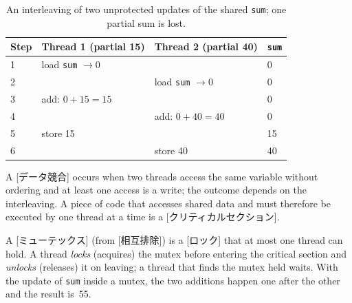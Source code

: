 \documentclass[../main.tex]{subfiles}
\begin{document}
\begin{table}[tb]
  \centering
  \small
  \caption{An interleaving of two unprotected updates of the shared
    \texttt{sum}; one partial sum is lost.}
  \label{tab:l02-race}
  \begin{tabular}{llll}
    \toprule
    Step & Thread 1 (partial 15) & Thread 2 (partial 40) & \texttt{sum} \\
    \midrule
    1 & load \texttt{sum} $\to 0$ &                            & 0 \\
    2 &                            & load \texttt{sum} $\to 0$ & 0 \\
    3 & add: $0+15=15$             &                            & 0 \\
    4 &                            & add: $0+40=40$             & 0 \\
    5 & store 15                   &                            & 15 \\
    6 &                            & store 40                   & 40 \\
    \bottomrule
  \end{tabular}
\end{table}

\begin{definition}
  A [データ競合] occurs when two threads access the same
  variable without ordering and at least one access is a write; the
  outcome depends on the interleaving.  A piece of code that accesses
  shared data and must therefore be executed by one thread at a time is a
  [クリティカルセクション].
\end{definition}


\begin{definition}[Mutex]
  A [ミューテックス] (from [相互排除])
  is a [ロック] that at most one thread can hold.  A thread
  \emph{locks} (acquires) the mutex before entering the critical section
  and \emph{unlocks} (releases) it on leaving; a thread that finds the
  mutex held waits.  With the update of \texttt{sum} inside a mutex, the
  two additions happen one after the other and the result is~55.
\end{definition}
\end{document}
